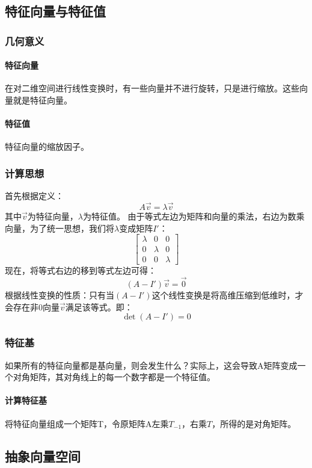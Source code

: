 \documentclass[UTF8]{ctexart}
\begin{document}
\subsection{特征向量与特征值}
\subsubsection{几何意义}
\paragraph{特征向量}
在对二维空间进行线性变换时，有一些向量并不进行旋转，只是进行缩放。这些向量就是特征向量。
\paragraph{特征值}
特征向量的缩放因子。
\subsubsection{计算思想}
首先根据定义：$$A\overrightarrow{v}=\lambda \overrightarrow{v}$$
其中$\overrightarrow{v}$为特征向量，$\lambda$为特征值。
由于等式左边为矩阵和向量的乘法，右边为数乘向量，为了统一思想，我们将$\lambda$变成矩阵$I'$：
$$\begin{bmatrix}
	\lambda & 0 & 0 \\
	0 & \lambda & 0 \\
	0 & 0 & \lambda 
\end{bmatrix}$$
现在，将等式右边的移到等式左边可得：
$$(A-I')\overrightarrow{v} = \overrightarrow{0}$$
根据线性变换的性质：只有当$(A-I')$这个线性变换是将高维压缩到低维时，才会存在非0向量$\overrightarrow{v}$满足该等式。即：
$$\det (A-I') = 0$$
\subsubsection{特征基}
如果所有的特征向量都是基向量，则会发生什么？实际上，这会导致A矩阵变成一个对角矩阵，其对角线上的每一个数字都是一个特征值。
\paragraph{计算特征基}
将特征向量组成一个矩阵T，令原矩阵A左乘$T_{-1}$，右乘$T$，所得的是对角矩阵。

\subsection{抽象向量空间}
\end{document}

